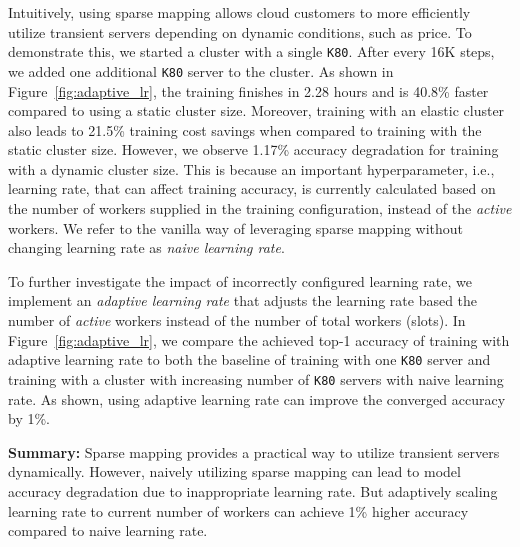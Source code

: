Intuitively, using sparse mapping allows cloud customers to  more efficiently
utilize transient servers depending on dynamic conditions, such as price. To
demonstrate this, we started a cluster  with a single \texttt{K80}. After every
16K steps, we added one additional \texttt{K80} server to the cluster. As shown
in Figure~\ref{fig:adaptive_lr}, the training finishes in 2.28 hours and is 40.8\% faster compared
to using a static cluster size.  Moreover, training with an elastic cluster
also leads to 21.5\% training cost savings when compared to training with the
static cluster size. However, we observe 1.17\% accuracy degradation for
training with a dynamic cluster size. This is because an important
hyperparameter, i.e., learning rate, that can affect training accuracy, is
currently calculated based on the number of workers supplied in the training
configuration, instead of the \emph{active} workers. We refer to the vanilla
way of leveraging sparse mapping without changing learning rate as \emph{naive
learning rate}. 


To further investigate the impact of incorrectly configured learning rate, we
implement an \emph{adaptive learning rate} that adjusts the learning rate based
the number of \emph{active} workers instead of the number of total workers
(slots). In Figure~\ref{fig:adaptive_lr}, we compare the achieved top-1 accuracy of training
with adaptive learning rate to both the baseline of training
with one \texttt{K80} server and training with a cluster with increasing number
of \texttt{K80} servers with naive learning rate. As shown, using adaptive learning rate can improve the
converged accuracy by 1\%. 

\textbf{Summary:} Sparse mapping provides a practical way to utilize transient
servers dynamically. However, naively utilizing sparse mapping can lead to
model accuracy degradation due to inappropriate learning rate. But adaptively scaling
learning rate to current number of workers can achieve 
1\% higher accuracy compared to naive learning rate.



